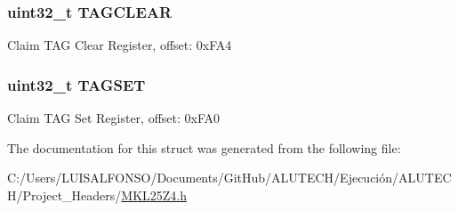 \subsubsection[{T\+A\+G\+C\+L\+E\+A\+R}]{\setlength{\rightskip}{0pt plus 5cm}uint32\+\_\+t T\+A\+G\+C\+L\+E\+A\+R}\label{struct_m_t_b___mem_map_a770a2c3d064a4ccfac867429f7b677da}
Claim T\+A\+G Clear Register, offset\+: 0x\+F\+A4 \hypertarget{struct_m_t_b___mem_map_a64be91040ad6f82ba46ef20d9f4f9dcf}{}
\subsubsection[{T\+A\+G\+S\+E\+T}]{\setlength{\rightskip}{0pt plus 5cm}uint32\+\_\+t T\+A\+G\+S\+E\+T}\label{struct_m_t_b___mem_map_a64be91040ad6f82ba46ef20d9f4f9dcf}
Claim T\+A\+G Set Register, offset\+: 0x\+F\+A0 

The documentation for this struct was generated from the following file\+:\begin{DoxyCompactItemize}
\item 
C\+:/\+Users/\+L\+U\+I\+S\+A\+L\+F\+O\+N\+S\+O/\+Documents/\+Git\+Hub/\+A\+L\+U\+T\+E\+C\+H/\+Ejecución/\+A\+L\+U\+T\+E\+C\+H/\+Project\+\_\+\+Headers/\hyperlink{_m_k_l25_z4_8h}{M\+K\+L25\+Z4.\+h}\end{DoxyCompactItemize}
